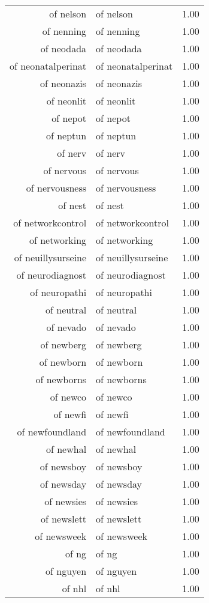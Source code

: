 \begin{table}[ht]
\begin{tabular}{rlr}
  of nelson & of nelson & 1.00 \\ 
  of nenning & of nenning & 1.00 \\ 
  of neodada & of neodada & 1.00 \\ 
  of neonatalperinat & of neonatalperinat & 1.00 \\ 
  of neonazis & of neonazis & 1.00 \\ 
  of neonlit & of neonlit & 1.00 \\ 
  of nepot & of nepot & 1.00 \\ 
  of neptun & of neptun & 1.00 \\ 
  of nerv & of nerv & 1.00 \\ 
  of nervous & of nervous & 1.00 \\ 
  of nervousness & of nervousness & 1.00 \\ 
  of nest & of nest & 1.00 \\ 
  of networkcontrol & of networkcontrol & 1.00 \\ 
  of networking & of networking & 1.00 \\ 
  of neuillysurseine & of neuillysurseine & 1.00 \\ 
  of neurodiagnost & of neurodiagnost & 1.00 \\ 
  of neuropathi & of neuropathi & 1.00 \\ 
  of neutral & of neutral & 1.00 \\ 
  of nevado & of nevado & 1.00 \\ 
  of newberg & of newberg & 1.00 \\ 
  of newborn & of newborn & 1.00 \\ 
  of newborns & of newborns & 1.00 \\ 
  of newco & of newco & 1.00 \\ 
  of newfi & of newfi & 1.00 \\ 
  of newfoundland & of newfoundland & 1.00 \\ 
  of newhal & of newhal & 1.00 \\ 
  of newsboy & of newsboy & 1.00 \\ 
  of newsday & of newsday & 1.00 \\ 
  of newsies & of newsies & 1.00 \\ 
  of newslett & of newslett & 1.00 \\ 
  of newsweek & of newsweek & 1.00 \\ 
  of ng & of ng & 1.00 \\ 
  of nguyen & of nguyen & 1.00 \\ 
  of nhl & of nhl & 1.00 \\ 

\end{tabular}
\end{table}
